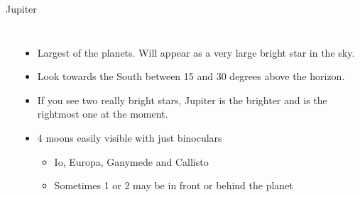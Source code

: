 \documentclass[pdf, ]{beamer}
\begin{document}
\begin{frame}{Jupiter}
	\begin{columns}
		\begin{center}
		\end{center}
		
		\begin{itemize}
			\item Largest of the planets. Will appear as a very large bright star in the sky.
			\item Look towards the South between 15 and 30 degrees above the horizon.
			\item If you see two really bright stars, Jupiter is the brighter and is the rightmost one at the moment.
			\item 4 moons easily visible with just binoculars
				\begin{itemize}
					\item Io, Europa, Ganymede and Callisto
					\item Sometimes 1 or 2 may be in front or behind the planet
				\end{itemize}
		\end{itemize}
	\end{columns}
\end{frame}
\end{document}
